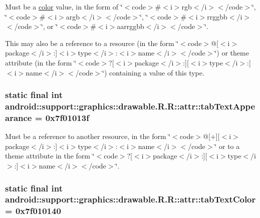 Must be a \hyperlink{classandroid_1_1support_1_1graphics_1_1drawable_1_1_r_1_1color}{color} value, in the form of \char`\"{}$<$code$>$\#$<$i$>$rgb$<$/i$>$$<$/code$>$\char`\"{}, \char`\"{}$<$code$>$\#$<$i$>$argb$<$/i$>$$<$/code$>$\char`\"{}, \char`\"{}$<$code$>$\#$<$i$>$rrggbb$<$/i$>$$<$/code$>$\char`\"{}, or \char`\"{}$<$code$>$\#$<$i$>$aarrggbb$<$/i$>$$<$/code$>$\char`\"{}. 

This may also be a reference to a resource (in the form \char`\"{}$<$code$>$@\mbox{[}$<$i$>$package$<$/i$>$:\mbox{]}$<$i$>$type$<$/i$>$:$<$i$>$name$<$/i$>$$<$/code$>$\char`\"{}) or theme attribute (in the form \char`\"{}$<$code$>$?\mbox{[}$<$i$>$package$<$/i$>$:\mbox{]}\mbox{[}$<$i$>$type$<$/i$>$:\mbox{]}$<$i$>$name$<$/i$>$$<$/code$>$\char`\"{}) containing a value of this type. \hypertarget{classandroid_1_1support_1_1graphics_1_1drawable_1_1_r_1_1attr_bf138a6eb2a9141e79a42c48b279febc}{
\subsubsection[{tabTextAppearance}]{\setlength{\rightskip}{0pt plus 5cm}static final int android::support::graphics::drawable.R.R::attr::tabTextAppearance = 0x7f01013f}}
\label{classandroid_1_1support_1_1graphics_1_1drawable_1_1_r_1_1attr_bf138a6eb2a9141e79a42c48b279febc}


Must be a reference to another resource, in the form \char`\"{}$<$code$>$@\mbox{[}+\mbox{]}\mbox{[}$<$i$>$package$<$/i$>$:\mbox{]}$<$i$>$type$<$/i$>$:$<$i$>$name$<$/i$>$$<$/code$>$\char`\"{} or to a theme attribute in the form \char`\"{}$<$code$>$?\mbox{[}$<$i$>$package$<$/i$>$:\mbox{]}\mbox{[}$<$i$>$type$<$/i$>$:\mbox{]}$<$i$>$name$<$/i$>$$<$/code$>$\char`\"{}. \hypertarget{classandroid_1_1support_1_1graphics_1_1drawable_1_1_r_1_1attr_a185f4a966938ffbfed8d23a65c412ba}{
\subsubsection[{tabTextColor}]{\setlength{\rightskip}{0pt plus 5cm}static final int android::support::graphics::drawable.R.R::attr::tabTextColor = 0x7f010140}}
\label{classandroid_1_1support_1_1graphics_1_1drawable_1_1_r_1_1attr_a185f4a966938ffbfed8d23a65c412ba}


